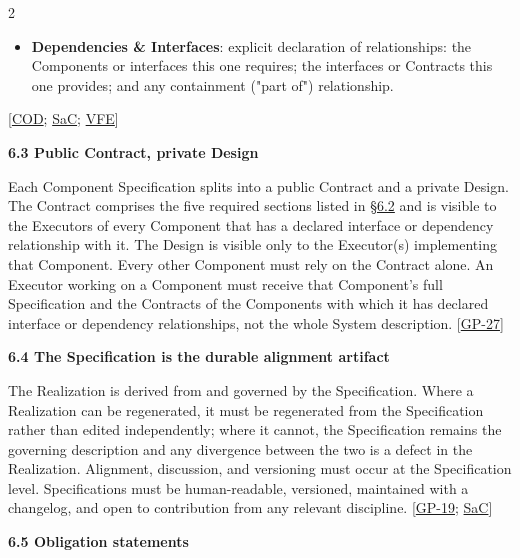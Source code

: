 \begin{multicols}{2}
\begin{itemize}
\item \textbf{Dependencies \& Interfaces}: explicit declaration of relationships: the Components or interfaces this one requires; the interfaces or Contracts this one provides; and any containment ("part of") relationship.

\end{itemize}

[\hyperlink{gp-COD}{COD}; \hyperlink{gp-SaC}{SaC}; \hyperlink{gp-VFE}{VFE}]

\hypertarget{nss-6.3}{}

\par\smallskip\noindent\textbf{6.3 Public Contract, private Design}\par\nopagebreak

Each Component Specification splits into a public Contract and a private Design. The Contract comprises the five required sections listed in \hyperlink{nss-6.2}{\S6.2} and is visible to the Executors of every Component that has a declared interface or dependency relationship with it. The Design is visible only to the Executor(s) implementing that Component. Every other Component must rely on the Contract alone. An Executor working on a Component must receive that Component's full Specification and the Contracts of the Components with which it has declared interface or dependency relationships, not the whole System description. [\hyperlink{gp-27}{GP-27}]

\hypertarget{nss-6.4}{}

\par\smallskip\noindent\textbf{6.4 The Specification is the durable alignment artifact}\par\nopagebreak

The Realization is derived from and governed by the Specification. Where a Realization can be regenerated, it must be regenerated from the Specification rather than edited independently; where it cannot, the Specification remains the governing description and any divergence between the two is a defect in the Realization. Alignment, discussion, and versioning must occur at the Specification level. Specifications must be human-readable, versioned, maintained with a changelog, and open to contribution from any relevant discipline. [\hyperlink{gp-19}{GP-19}; \hyperlink{gp-SaC}{SaC}]

\hypertarget{nss-6.5}{}

\par\smallskip\noindent\textbf{6.5 Obligation statements}\par\nopagebreak


\end{multicols}
